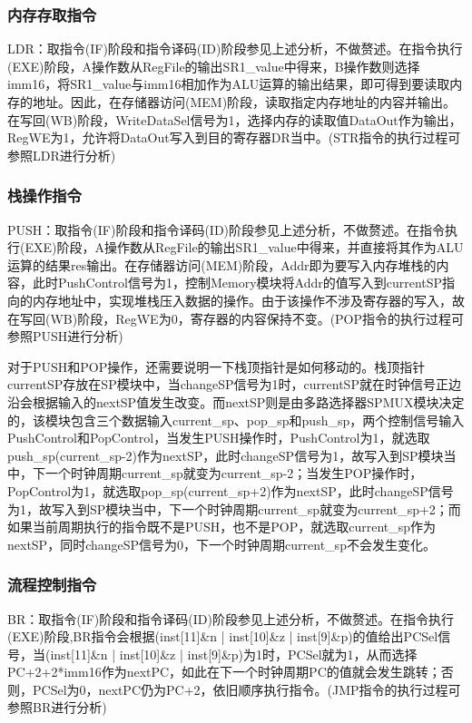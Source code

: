 \documentclass{article}
\begin{document}
\subsubsection{内存存取指令}
LDR：取指令(IF)阶段和指令译码(ID)阶段参见上述分析，不做赘述。在指令执行(EXE)阶段，A操作数从RegFile的输出SR1\_value中得来，B操作数则选择imm16，将SR1\_value与imm16相加作为ALU运算的输出结果，即可得到要读取内存的地址。因此，在存储器访问(MEM)阶段，读取指定内存地址的内容并输出。在写回(WB)阶段，WriteDataSel信号为1，选择内存的读取值DataOut作为输出，RegWE为1，允许将DataOut写入到目的寄存器DR当中。(STR指令的执行过程可参照LDR进行分析)

\subsubsection{栈操作指令}
PUSH：取指令(IF)阶段和指令译码(ID)阶段参见上述分析，不做赘述。在指令执行(EXE)阶段，A操作数从RegFile的输出SR1\_value中得来，并直接将其作为ALU运算的结果res输出。在存储器访问(MEM)阶段，Addr即为要写入内存堆栈的内容，此时PushControl信号为1，控制Memory模块将Addr的值写入到currentSP指向的内存地址中，实现堆栈压入数据的操作。由于该操作不涉及寄存器的写入，故在写回(WB)阶段，RegWE为0，寄存器的内容保持不变。(POP指令的执行过程可参照PUSH进行分析)

对于PUSH和POP操作，还需要说明一下栈顶指针是如何移动的。栈顶指针currentSP存放在SP模块中，当changeSP信号为1时，currentSP就在时钟信号正边沿会根据输入的nextSP值发生改变。而nextSP则是由多路选择器SPMUX模块决定的，该模块包含三个数据输入current\_sp、pop\_sp和push\_sp，两个控制信号输入PushControl和PopControl，当发生PUSH操作时，PushControl为1，就选取push\_sp(current\_sp-2)作为nextSP，此时changeSP信号为1，故写入到SP模块当中，下一个时钟周期current\_sp就变为current\_sp-2；当发生POP操作时，PopControl为1，就选取pop\_sp(current\_sp+2)作为nextSP，此时changeSP信号为1，故写入到SP模块当中，下一个时钟周期current\_sp就变为current\_sp+2；而如果当前周期执行的指令既不是PUSH，也不是POP，就选取current\_sp作为nextSP，同时changeSP信号为0，下一个时钟周期current\_sp不会发生变化。

\subsubsection{流程控制指令}
BR：取指令(IF)阶段和指令译码(ID)阶段参见上述分析，不做赘述。在指令执行(EXE)阶段,BR指令会根据(inst[11]\&n | inst[10]\&z | inst[9]\&p)的值给出PCSel信号，当(inst[11]\&n | inst[10]\&z | inst[9]\&p)为1时，PCSel就为1，从而选择PC+2+2*imm16作为nextPC，如此在下一个时钟周期PC的值就会发生跳转；否则，PCSel为0，nextPC仍为PC+2，依旧顺序执行指令。(JMP指令的执行过程可参照BR进行分析)
\end{document}
